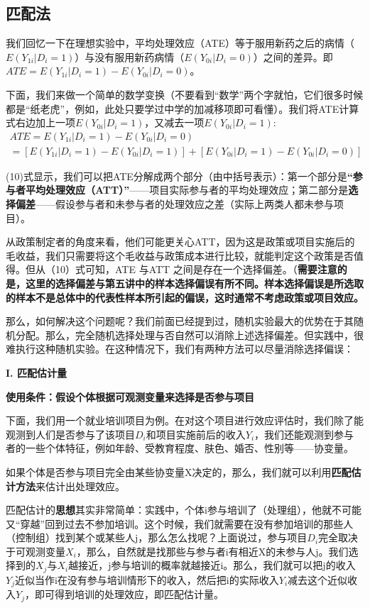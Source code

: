 \documentclass[cn,12pt,math=newtx,citestyle=gb7714-2015,bibstyle=gb7714-2015]{elegantbook}
\begin{document}
	\subsection{匹配法}
	
	我们回忆一下在理想实验中，平均处理效应（ATE）等于服用新药之后的病情（$E(Y_{1i}\big|D_i=1)$）与没有服用新药病情（$E(Y_{0i}\big|D_i=0)$）之间的差异。即
	$ATE=E(Y_{1i}\big|D_i=1)-E(Y_{0i}\big|D_i=0)$。
	
	下面，我们来做一个简单的数学变换（不要看到“数学”两个字就怕，它们很多时候都是“纸老虎”，例如，此处只要学过中学的加减移项即可看懂）。我们将ATE计算式右边加上一项$E(Y_{0i}\big|D_i=1)$，又减去一项$E(Y_{0i}\big|D_i=1)$:
	\begin{gather}
		ATE=E(Y_{1i}\big|D_i=1)-E(Y_{0i}\big|D_i=0)\nonumber\\
		=[E(Y_{1i}\big|D_i=1)-E(Y_{0i}\big|D_i=1)]+[E(Y_{0i}\big|D_i=1)-E(Y_{0i}\big|D_i=0)]
	\end{gather}
	
	(10)式显示，我们可以把ATE分解成两个部分（由中括号表示）：第一个部分是\textbf{“参与者平均处理效应（ATT）”}——项目实际参与者的平均处理效应；第二部分是\textbf{选择偏差}——假设参与者和未参与者的处理效应之差（实际上两类人都未参与项目）。
	
	从政策制定者的角度来看，他们可能更关心ATT，因为这是政策或项目实施后的毛收益，我们只需要将这个毛收益与政策成本进行比较，就能判定这个政策是否值得。但从（10）式可知，ATE 与ATT 之间是存在一个选择偏差。（\textbf{需要注意的是，这里的选择偏差与第五讲中的样本选择偏误有所不同。样本选择偏误是所选取的样本不是总体中的代表性样本所引起的偏误，这时通常不考虑政策或项目效应。}
	
	那么，如何解决这个问题呢？我们前面已经提到过，随机实验最大的优势在于其随机分配。那么，完全随机选择处理与否自然可以消除上述选择偏差。但实践中，很难执行这种随机实验。在这种情况下，我们有两种方法可以尽量消除选择偏误：
	
	\textbf{I. 匹配估计量}
	
	\textbf{使用条件：假设个体根据可观测变量来选择是否参与项目}
	
	下面，我们用一个就业培训项目为例。在对这个项目进行效应评估时，我们除了能观测到人们是否参与了该项目$D_i$和项目实施前后的收入$Y_i$，我们还能观测到参与者的一些个体特征，例如年龄、受教育程度、肤色、婚否、性别等——协变量。
	
	如果个体是否参与项目完全由某些协变量X决定的，那么，我们就可以利用\textbf{匹配估计方法}来估计出处理效应。
	
	匹配估计的\textbf{思想}其实非常简单：实践中，个体i参与培训了（处理组），他就不可能又“穿越”回到过去不参加培训。这个时候，我们就需要在没有参加培训的那些人（控制组）找到某个或某些人j，那么怎么找呢？上面说过，参与项目$D_i$完全取决于可观测变量$X_i$，那么，自然就是找那些与参与者i有相近X的未参与人j。我们选择到的$X_j$与$X_i$越接近，j参与培训的概率就越接近i。那么，我们就可以把j的收入$Y_j$近似当作i在没有参与培训情形下的收入，然后把i的实际收入$Y_i$减去这个近似收入$Y_j$，即可得到培训的处理效应，即匹配估计量。
	
\end{document}
